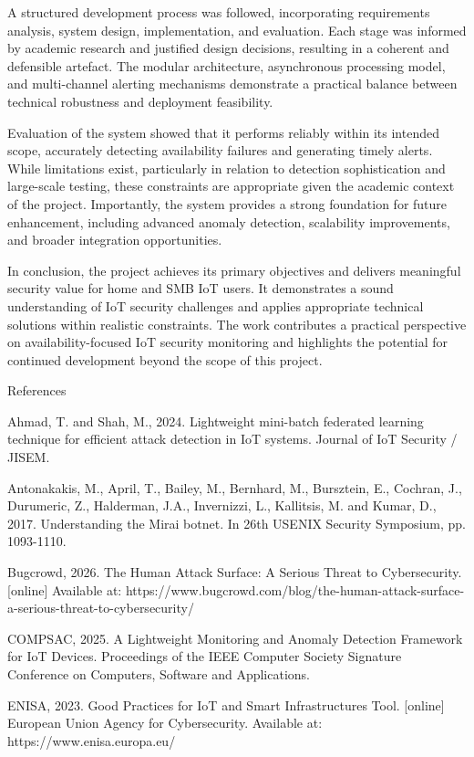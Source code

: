 A structured development process was followed, incorporating requirements analysis, system design, implementation, and evaluation. Each stage was informed by academic research and justified design decisions, resulting in a coherent and defensible artefact. The modular architecture, asynchronous processing model, and multi-channel alerting mechanisms demonstrate a practical balance between technical robustness and deployment feasibility.

Evaluation of the system showed that it performs reliably within its intended scope, accurately detecting availability failures and generating timely alerts. While limitations exist, particularly in relation to detection sophistication and large-scale testing, these constraints are appropriate given the academic context of the project. Importantly, the system provides a strong foundation for future enhancement, including advanced anomaly detection, scalability improvements, and broader integration opportunities.

In conclusion, the project achieves its primary objectives and delivers meaningful security value for home and SMB IoT users. It demonstrates a sound understanding of IoT security challenges and applies appropriate technical solutions within realistic constraints. The work contributes a practical perspective on availability-focused IoT security monitoring and highlights the potential for continued development beyond the scope of this project.

 References

Ahmad, T. and Shah, M., 2024. Lightweight mini-batch federated learning technique for efficient attack detection in IoT systems. Journal of IoT Security / JISEM.

Antonakakis, M., April, T., Bailey, M., Bernhard, M., Bursztein, E., Cochran, J., Durumeric, Z., Halderman, J.A., Invernizzi, L., Kallitsis, M. and Kumar, D., 2017. Understanding the Mirai botnet. In 26th USENIX Security Symposium, pp. 1093-1110.

Bugcrowd, 2026. The Human Attack Surface: A Serious Threat to Cybersecurity. [online] Available at: https://www.bugcrowd.com/blog/the-human-attack-surface-a-serious-threat-to-cybersecurity/

COMPSAC, 2025. A Lightweight Monitoring and Anomaly Detection Framework for IoT Devices. Proceedings of the IEEE Computer Society Signature Conference on Computers, Software and Applications.

ENISA, 2023. Good Practices for IoT and Smart Infrastructures Tool. [online] European Union Agency for Cybersecurity. Available at: https://www.enisa.europa.eu/

